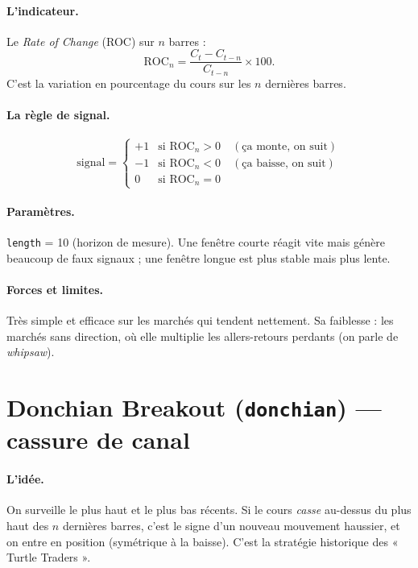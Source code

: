 \documentclass[11pt,a4paper]{article}
\newcommand{\code}[1]{\texttt{#1}}
\begin{document}
\paragraph{L'indicateur.} Le \emph{Rate of Change} (ROC) sur $n$ barres :
\[
  \text{ROC}_n = \frac{C_t - C_{t-n}}{C_{t-n}} \times 100 .
\]
C'est la variation en pourcentage du cours sur les $n$ dernières barres.

\paragraph{La règle de signal.}
\[
  \text{signal} =
  \begin{cases}
    +1 & \text{si } \text{ROC}_n > 0 \quad(\text{ça monte, on suit})\\
    -1 & \text{si } \text{ROC}_n < 0 \quad(\text{ça baisse, on suit})\\
    0  & \text{si } \text{ROC}_n = 0
  \end{cases}
\]

\paragraph{Paramètres.} \code{length} = 10 (horizon de mesure). Une fenêtre
courte réagit vite mais génère beaucoup de faux signaux ; une fenêtre longue est
plus stable mais plus lente.

\paragraph{Forces et limites.} Très simple et efficace sur les marchés qui
tendent nettement. Sa faiblesse : les marchés sans direction, où elle
multiplie les allers-retours perdants (on parle de \emph{whipsaw}).

\section{Donchian Breakout \textnormal{(\code{donchian})} --- cassure de canal}

\paragraph{L'idée.} On surveille le plus haut et le plus bas récents. Si le
cours \emph{casse} au-dessus du plus haut des $n$ dernières barres, c'est le
signe d'un nouveau mouvement haussier, et on entre en position (symétrique à la
baisse). C'est la stratégie historique des « Turtle Traders ».
\end{document}
